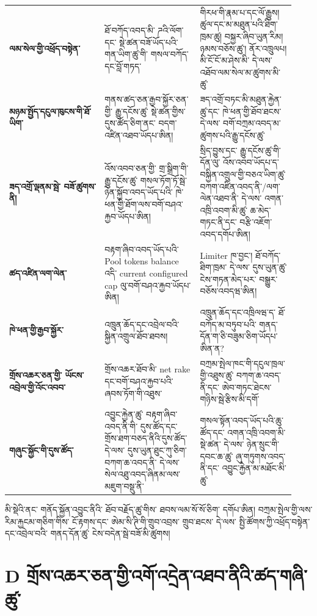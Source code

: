 \documentclass[11pt]{article}
\begin{document}
\begin{longtable}{P{0.31\linewidth} P{0.31\linewidth} P{0.31\linewidth}}
\textbf{ལམ་སེལ་གྱི་འཕྲོད་བསྟེན་} & ཐོ་བཀོད་འབད་མི་ ཌའི་ལོག་དང་ སྡེ་ཚན་བཟོ་ཡོད་པའི་གན་ཡིག་ཚུ་གི་ གསལ་བཀོད་དང་བློ་གཏད་ & གིརཕ་གི་རྣམ་པ་དང་ལོ་རྒྱུས། ཚུལ་དང་མ་མཐུན་པའི་ཐིག་ཁྲམ་ཚུ། བསྐྱར་ཞིབ་ཡུན་རིམ། ཉམས་བཅོས་ཚུ་། ནོར་འཁྲུལཔ། མི་ངོ་ངོ་མ་ཤེས་མི་ དེ་ལས་ འཐོབ་ལམ་སེལ་མ་ཚུགས་མི་ཚུ་ \\
\textbf{མཉམ་སྤྱོད་དངུལ་ཁུངས་གི་ཐོ་ཡིག་} & གནས་ཚད་ཅན་རྒྱབ་སྐྱོར་ཅན་གྱི་ རྒྱུ་དངོས་ཚུ་ སྡེ་ཚན་གྱིས་ དུས་ཚོད་ཅིག་ནང་ བདག་འཛིན་འཐབ་ཡོདཔ་ཨིན། & ཟད་འགྲོ་བཏང་མི་མཐུན་རྐྱེན་ཚུ་དང་ ཁེ་ཕན་གྱི་ཐོབ་ཐངས་ དེ་ལས་ བགོ་བཀྲམ་འབད་མ་ཚུགས་པའི་རྒྱུ་དངོས་ཚུ་ \\
\textbf{ཟད་འགྲོ་ལྡནམ་སྦེ་ བཟོ་ཚུགས་ནི།} & འོས་འབབ་ཅན་གྱི་ གྲ་སྒྲིག་གི་རྒྱུ་དངོས་ཚུ་ གསལ་ཏོག་ཏོ་སྦེ་ ཉེན་སྐྱོབ་འབད་ཡོད་པའི་ ཁེ་ཕན་གྱི་ཐོག་ལས་བགོ་བཤའ་རྐྱབ་ཡོདཔ་ཨིན། & སྲིད་བྱུས་དང་ རྒྱུ་དངོས་ཚུ་གི་དོན་ལུ་ འོས་འབབ་ཡོདཔ་ད་ བསྐྱིན་འགྲུལ་གྱི་བཅའ་ཡིག་ཚུ་ བཀག་འཛིན་འབད་ནི་/ལག་ལེན་འཐབ་ནི་ དེ་ལས་ འགན་འཁྲི་འབག་མི་ཚུ་ ཆ་མེད་གཏང་ནི་དང་ བརྩི་འཇོག་འབད་དགོཔ་ཨིན། \\
\textbf{ཚད་འཛིན་ལག་ལེན་} & བརྟག་ཞིབ་འབད་ཡོད་པའི་ Pool tokens balance འདི་ current configured cap ལུ་བགོ་བཤའ་རྐྱབ་ཡོདཔ་ཨིན། & Limiter ཁ་བྱང་། ཐོ་བཀོད་ཐིག་ཁྲམ་ དེ་ལས་ དུས་ཡུན་ཚུ་ ངེས་གཏན་མེད་པར་ བསྒྱུར་བཅོས་འབདཝ་ཨིན། \\
\textbf{ཁེ་ཕན་གྱི་རྒྱབ་སྐྱོར་} & འཁྲུན་ཆོད་དང་འབྲེལ་བའི་ སྐྱིན་འགྲུལ་ཐོབ་ཐབས། & འཁྲུན་ཆོད་དང་འཁྲིལཝ་ད་ ཐོ་བཀོད་མ་བཏུབ་པའི་ གནད་དོན་ག་ཅི་བཟུམ་ཅིག་ཡོདཔ་ཨིན་ན? \\
\textbf{གྲོས་འཆར་ཅན་གྱི་ ཡོངས་འབྲེལ་གྱི་འོང་འབབ་} & གྲོས་འཆར་ཐོབ་མི་ net rake དང་བགོ་བཤའ་རྐྱབ་པའི་ཞབས་ཏོག་གི་འཐུས་ & བཀྲམ་སྤེལ་ཁང་གི་དངུལ་ཁྲལ་གྱི་འཐུས་ཚུ་ བཀག་ཆ་འབད་ནི་དང་ ཨེབ་གཏང་ཐེངས་གཉིས་སྦེ་རྩིས་མི་དགོ་ \\
\textbf{གཞུང་སྐྱོང་གི་དུས་ཚོད་} & འབྱུང་རྐྱེན་ཚུ་ བརྟག་ཞིབ་འབད་ནི་གི་ དུས་ཚོད་དང་ གྲོས་ཐག་བཅད་ནིའི་དུས་ཚོད་ དེ་ལས་ དུས་ཡུན་ཐུང་ཀུ་ཅིག་ བཀག་ཆ་འབད་ནི་ དེ་ལས་ སེལ་འཐུ་འབད་ཞིནམ་ལས་ མཇུག་བསྡུ་ནི་ & གསལ་སྟོན་འབད་ཡོད་པའི་ཆུ་ཚོད་དང་ འགན་འཁྲི་འབག་མི་སྡེ་ཚན་ དེ་ལས་ ཉེན་སྲུང་གི་དབང་ཆ་ཚུ་ ཞུ་གཏུགས་འབད་ནི་དང་ འབྱུང་རྐྱེན་མ་མཐོང་མི་ཚུ་ \\
\bottomrule
\end{longtable}

མི་སྡེའི་ནང་ གནོད་སྐྱོན་འབྱུང་ནིའི་ ཐོབ་བརྗོད་ཚུ་གིས་ ཐབས་ལམ་སོ་སོ་ཅིག་ དགོཔ་ཨིན། བཀྲམ་སྤེལ་གྱི་ལས་རིམ་རྐྱངམ་གཅིག་གིས་ ངོ་རྟགས་དང་ ཨེམ་སི་ཊི་གི་གྲུབ་འབྲས་ གྲུབ་ཐངས་ དེ་ལས་ སྤྱི་ཚོགས་ཀྱི་འཕྲོད་བསྟེན་དང་འབྲེལ་བའི་ གནད་དོན་ཚུ་ ངེས་བདེན་སྦེ་བཟོ་མི་ཚུགས།


\section*{D གྲོས་འཆར་ཅན་གྱི་འགོ་འདྲེན་འཐབ་ནིའི་ཚད་གཞི་ཚུ་}
\end{document}
